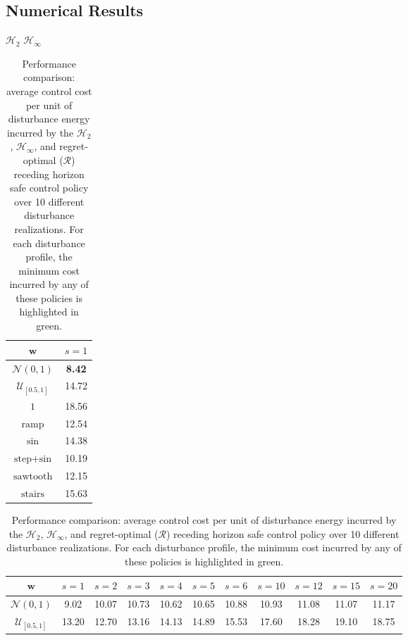\documentclass[conference]{IEEEtran}
\begin{document}
\subsection{Numerical Results}
\begin{table}[hbt]
    \caption{Performance comparison: average control cost per unit of disturbance energy incurred by the $\mathcal{H}_2$, $\mathcal{H}_\infty$, and regret-optimal ($\mathcal{R}$) receding horizon safe control policy over 10 different disturbance realizations. For each disturbance profile, the minimum cost incurred by any of these policies is highlighted in \textcolor{mygreen}{green}.}
    \label{table:results}
    \vspace{3pt}
    \centering
    \hspace{-4.5cm} $\mathcal{H}_2$ \hspace{8.5cm} $\mathcal{H}_\infty$\vspace{1mm}\\
    \begin{tabular}{c|c}
        \hline
        $\mathbf{w}$ & $s = 1$\\
        \hline
        \rowcolor{lightgray} $\mathcal{N}(0,1)$ & {\color{mygreen} \textbf{8.42}}\\
        $\mathcal{U}_{[0.5, 1]}$ & 14.72\\
        \rowcolor{lightgray} $1$ & 18.56\\
        $\operatorname{ramp}$ & 12.54\\
        \rowcolor{lightgray} $\operatorname{sin}$ & 14.38\\
        $\operatorname{step+sin}$ & 10.19\\
        \rowcolor{lightgray} $\operatorname{sawtooth}$ & 12.15\\
        $\operatorname{stairs}$ & 15.63\\
        \hline
    \end{tabular}
    \hspace{5mm}
    \begin{tabular}{c|cccccccccc}
        \hline
        $\mathbf{w}$ & $s = 1$ & $s = 2$ & $s = 3$ & $s = 4$ & $s = 5$ & $s = 6$ & $s = 10$ & $s = 12$ & $s = 15$ & $s = 20$\\
        \hline
        \rowcolor{lightgray} $\mathcal{N}(0,1)$        &  9.02 & 10.07 & 10.73 & 10.62 & 10.65 & 10.88 & 10.93 & 11.08 & 11.07 & 11.17\\
        $\mathcal{U}_{[0.5, 1]}$  & 13.20 & 12.70 & 13.16 & 14.13 & 14.89 & 15.53 & 17.60 & 18.28 & 19.10 & 18.75\\

\end{tabular}
\end{table}
\end{document}
